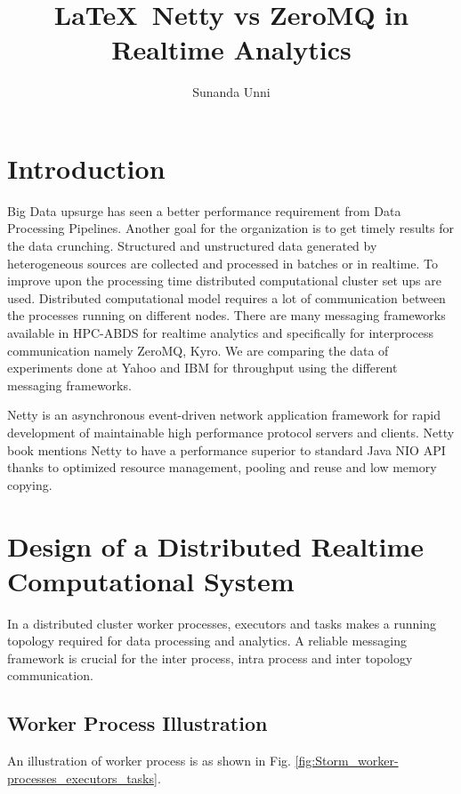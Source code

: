 \documentclass[9pt,twocolumn,twoside]{styles/osajnl}
\title{\LaTeX\ Netty vs ZeroMQ in Realtime Analytics}
\author[1]{Sunanda Unni}
\affil[1]{School of Informatics and Computing, Bloomington, IN 47408, U.S.A.}
\begin{document}
\maketitle

\section{Introduction}

Big Data upsurge has seen a better performance requirement from Data
Processing Pipelines.  Another goal for the organization is to get
timely results for the data crunching. Structured and unstructured
data generated by heterogeneous sources are collected and processed in
batches or in realtime. To improve upon the processing time
distributed computational cluster set ups are used.  Distributed
computational model requires a lot of communication between the
processes running on different nodes. There are many messaging
frameworks available in HPC-ABDS for realtime analytics and
specifically for interprocess communication namely ZeroMQ, Kyro. We
are comparing the data of experiments done at Yahoo and IBM for
throughput using the different messaging frameworks.

Netty \cite{www-netty} is an asynchronous event-driven network
application framework for rapid development of maintainable high
performance protocol servers and clients.  Netty book
\cite{netty-book} mentions Netty to have a performance superior to
standard Java NIO API thanks to optimized resource management, pooling
and reuse and low memory copying.

\section{Design of a Distributed Realtime Computational System}

In a distributed cluster worker processes, executors and tasks makes a
running topology required for data processing and analytics. A
reliable messaging framework is crucial for the inter process, intra
process and inter topology communication.

\subsection{Worker Process Illustration}
An illustration of worker process is as shown in
Fig. \ref{fig:Storm_worker-processes_executors_tasks}.
\end{document}
